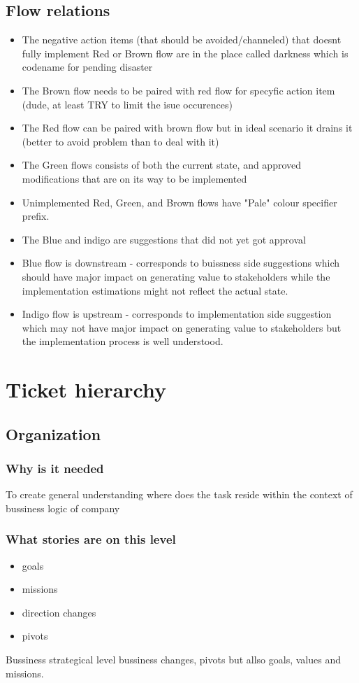 \subsection{Flow relations}
\begin{itemize}
  \item The negative action items (that should be avoided/channeled) that doesnt fully implement 
  Red or Brown flow are in the place called darkness which is codename for pending disaster
  \item The Brown flow needs to be paired with red flow for specyfic action item (dude, at least TRY to limit the isue occurences)
  \item The Red flow can be paired with brown flow but in ideal scenario it drains it (better to avoid problem than to deal with it)
  \item The Green flows consists of both the current state, and approved modifications that are on its way to be implemented
  \item Unimplemented Red, Green, and Brown flows have "Pale" colour specifier prefix.
  \item The Blue and indigo are suggestions that did not yet got approval
  \item Blue flow is downstream - corresponds to buissness side suggestions which should have major impact on generating value to stakeholders while the implementation estimations might not reflect the actual state.
  \item Indigo flow is upstream - corresponds to implementation side suggestion which may not have major impact on generating value to stakeholders but the implementation process is well understood.
\end{itemize}
\newpage
\section{Ticket hierarchy}
\subsection{Organization}
\subsubsection{Why is it needed}
To create general understanding  where does the task reside within the context of bussiness logic of company
\subsubsection{What stories are on this level}
\begin{itemize}
    \item goals
    \item missions
    \item direction changes
    \item pivots
\end{itemize}
Bussiness strategical level bussiness changes, pivots but allso goals, values and missions.
